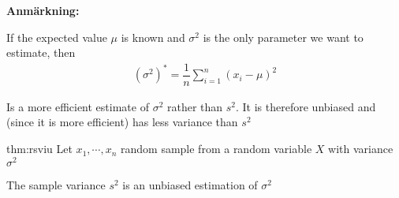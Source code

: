 \par\bigskip
\noindent\textbf{Anmärkning:}\par
\noindent If the expected value $\mu$ is known and $\sigma^2$ is the only parameter we want to estimate, then
\begin{equation*}
  \begin{gathered}
    (\sigma^2)^* = \dfrac{1}{n}\sum_{i=1}^{n}(x_i-\mu)^2
  \end{gathered}
\end{equation*}\par
\noindent Is a more efficient estimate of $\sigma^2$ rather than $s^2$. It is therefore unbiased and (since it is more efficient) has less variance than $s^2$ 
\par\bigskip
\begin{theo}{thm:rsviu}
  Let $x_1,\cdots,x_n$ random sample from a random variable $X$ with variance $\sigma^2$ 
  \par\bigskip
  \noindent The sample variance $s^2$ is an unbiased estimation of $\sigma^2$ 
\end{theo}
\newpage

